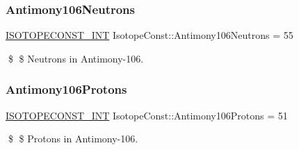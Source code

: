 \subsubsection{\texorpdfstring{Antimony106\+Neutrons}{Antimony106Neutrons}}
{\footnotesize\ttfamily \mbox{\hyperlink{group___isotope_const-_macros_ga5f18360b3e99483a35c32d789e62621c}{I\+S\+O\+T\+O\+P\+E\+C\+O\+N\+S\+T\+\_\+\+I\+NT}} Isotope\+Const\+::\+Antimony106\+Neutrons = 55}

\$ \$ Neutrons in Antimony-\/106. \mbox{\label{group___isotope_const-_antimony-_sb106_ga0d1ba6ab614f4b5ec115a51929f3cd33}} 
\subsubsection{\texorpdfstring{Antimony106\+Protons}{Antimony106Protons}}
{\footnotesize\ttfamily \mbox{\hyperlink{group___isotope_const-_macros_ga5f18360b3e99483a35c32d789e62621c}{I\+S\+O\+T\+O\+P\+E\+C\+O\+N\+S\+T\+\_\+\+I\+NT}} Isotope\+Const\+::\+Antimony106\+Protons = 51}

\$ \$ Protons in Antimony-\/106. 